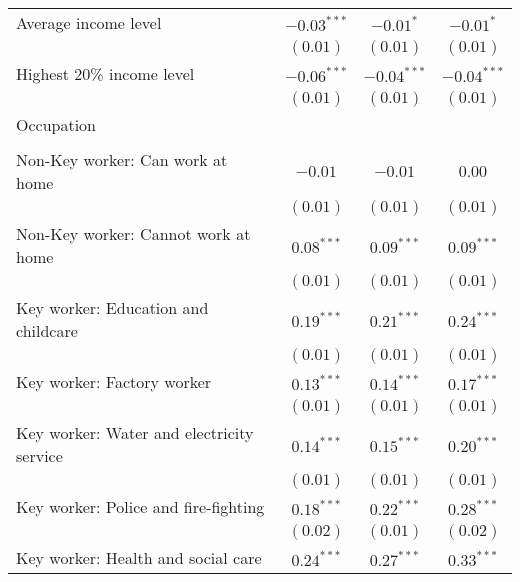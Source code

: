 \begin{table}
\begin{center}
\begin{scriptsize}
\begin{tabular}{l c c c}
\quad Average income level                      & $-0.03^{***}$ & $-0.01^{*}$   & $-0.01^{*}$   \\
                                                & $(0.01)$      & $(0.01)$      & $(0.01)$      \\
\quad Highest 20\% income level                 & $-0.06^{***}$ & $-0.04^{***}$ & $-0.04^{***}$ \\
                                                & $(0.01)$      & $(0.01)$      & $(0.01)$      \\
Occupation                                      &               &               &               \\
                                                &               &               &               \\
\quad Non-Key worker: Can work at home          & $-0.01$       & $-0.01$       & $0.00$        \\
                                                & $(0.01)$      & $(0.01)$      & $(0.01)$      \\
\quad Non-Key worker: Cannot work at home       & $0.08^{***}$  & $0.09^{***}$  & $0.09^{***}$  \\
                                                & $(0.01)$      & $(0.01)$      & $(0.01)$      \\
\quad Key worker: Education and childcare       & $0.19^{***}$  & $0.21^{***}$  & $0.24^{***}$  \\
                                                & $(0.01)$      & $(0.01)$      & $(0.01)$      \\
\quad Key worker: Factory worker                & $0.13^{***}$  & $0.14^{***}$  & $0.17^{***}$  \\
                                                & $(0.01)$      & $(0.01)$      & $(0.01)$      \\
\quad Key worker: Water and electricity service & $0.14^{***}$  & $0.15^{***}$  & $0.20^{***}$  \\
                                                & $(0.01)$      & $(0.01)$      & $(0.01)$      \\
\quad Key worker: Police and fire-fighting      & $0.18^{***}$  & $0.22^{***}$  & $0.28^{***}$  \\
                                                & $(0.02)$      & $(0.01)$      & $(0.02)$      \\
\quad Key worker: Health and social care        & $0.24^{***}$  & $0.27^{***}$  & $0.33^{***}$  \\

\end{tabular}
\end{scriptsize}
\end{center}
\end{table}
